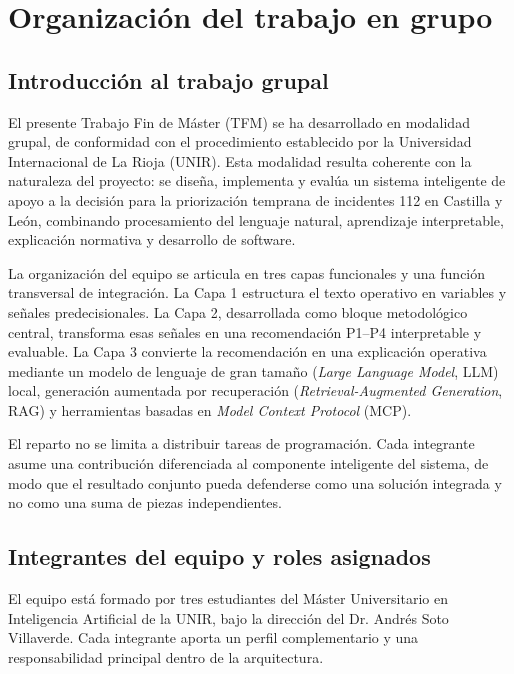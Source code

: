 ﻿\chapter*{Organización del trabajo en grupo}
\setcounter{secnumdepth}{-1}

\section{Introducción al trabajo grupal}

El presente Trabajo Fin de Máster (TFM) se ha desarrollado en modalidad grupal, de conformidad con el procedimiento establecido por la Universidad Internacional de La Rioja (UNIR). Esta modalidad resulta coherente con la naturaleza del proyecto: se diseña, implementa y evalúa un sistema inteligente de apoyo a la decisión para la priorización temprana de incidentes 112 en Castilla y León, combinando procesamiento del lenguaje natural, aprendizaje interpretable, explicación normativa y desarrollo de software.

La organización del equipo se articula en tres capas funcionales y una función transversal de integración. La Capa 1 estructura el texto operativo en variables y señales predecisionales. La Capa 2, desarrollada como bloque metodológico central, transforma esas señales en una recomendación P1--P4 interpretable y evaluable. La Capa 3 convierte la recomendación en una explicación operativa mediante un modelo de lenguaje de gran tamaño (\textit{Large Language Model}, LLM) local, generación aumentada por recuperación (\textit{Retrieval-Augmented Generation}, RAG) y herramientas basadas en \textit{Model Context Protocol} (MCP).

El reparto no se limita a distribuir tareas de programación. Cada integrante asume una contribución diferenciada al componente inteligente del sistema, de modo que el resultado conjunto pueda defenderse como una solución integrada y no como una suma de piezas independientes.

\section{Integrantes del equipo y roles asignados}

El equipo está formado por tres estudiantes del Máster Universitario en Inteligencia Artificial de la UNIR, bajo la dirección del Dr. Andrés Soto Villaverde. Cada integrante aporta un perfil complementario y una responsabilidad principal dentro de la arquitectura.

